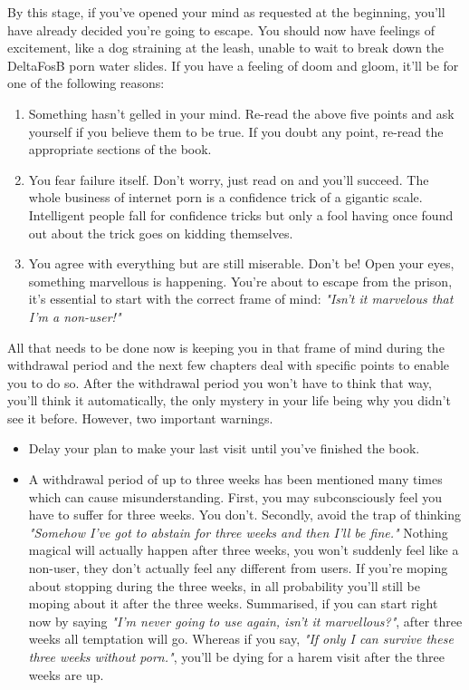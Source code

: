 \documentclass[easypeasy]{subfiles}
\begin{document}
By this stage, if you've opened your mind as requested at the beginning, you'll have already decided you're going to escape. You should now have feelings of excitement, like a dog straining at the leash, unable to wait to break down the DeltaFosB porn water slides. If you have a feeling of doom and gloom, it'll be for one of the following reasons:
\begin{enumerate}
  \item Something hasn't gelled in your mind. Re-read the above five points and ask yourself if you believe them to be true. If you doubt any point, re-read the appropriate sections of the book.

  \item You fear failure itself. Don't worry, just read on and you'll succeed. The whole business of internet porn is a confidence trick of a gigantic scale. Intelligent people fall for confidence tricks but only a fool having once found out about the trick goes on kidding themselves.

  \item You agree with everything but are still miserable. Don't be! Open your eyes, something marvellous is happening. You're about to escape from the prison, it's essential to start with the correct frame of mind: \textit{"Isn't it marvelous that I'm a non-user!"}
  \end{enumerate}

All that needs to be done now is keeping you in that frame of mind during the withdrawal period and the next few chapters deal with specific points to enable you to do so. After the withdrawal period you won't have to think that way, you'll think it automatically, the only mystery in your life being why you didn't see it before. However, two important warnings.

  \begin{itemize}
  \item Delay your plan to make your last visit until you've finished the book.
  \item A withdrawal period of up to three weeks has been mentioned many times which can cause misunderstanding. First, you may subconsciously feel you have to suffer for three weeks. You don't. Secondly, avoid the trap of thinking \textit{"Somehow I've got to abstain for three weeks and then I'll be fine."} Nothing magical will actually happen after three weeks, you won't suddenly feel like a non-user, they don't actually feel any different from users. If you're moping about stopping during the three weeks, in all probability you'll still be moping about it after the three weeks. Summarised, if you can start right now by saying \textit{"I'm never going to use again, isn't it marvellous?"}, after three weeks all temptation will go. Whereas if you say, \textit{"If only I can survive these three weeks without porn."}, you'll be dying for a harem visit after the three weeks are up.
  \end{itemize}
\end{document}
